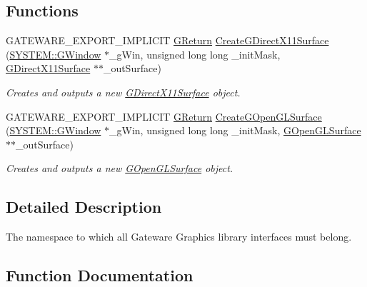 \subsection*{Functions}
\begin{DoxyCompactItemize}
\item 
G\+A\+T\+E\+W\+A\+R\+E\+\_\+\+E\+X\+P\+O\+R\+T\+\_\+\+I\+M\+P\+L\+I\+C\+IT \hyperlink{namespaceGW_a67a839e3df7ea8a5c5686613a7a3de21}{G\+Return} \hyperlink{namespaceGW_1_1GRAPHICS_a3fc9ce5171f60466f1e8784ea13b31ce}{Create\+G\+Direct\+X11\+Surface} (\hyperlink{classGW_1_1SYSTEM_1_1GWindow}{S\+Y\+S\+T\+E\+M\+::\+G\+Window} $\ast$\+\_\+g\+Win, unsigned long long \+\_\+init\+Mask, \hyperlink{classGW_1_1GRAPHICS_1_1GDirectX11Surface}{G\+Direct\+X11\+Surface} $\ast$$\ast$\+\_\+out\+Surface)
\begin{DoxyCompactList}\small\item\em Creates and outputs a new \hyperlink{classGW_1_1GRAPHICS_1_1GDirectX11Surface}{G\+Direct\+X11\+Surface} object. \end{DoxyCompactList}\item 
G\+A\+T\+E\+W\+A\+R\+E\+\_\+\+E\+X\+P\+O\+R\+T\+\_\+\+I\+M\+P\+L\+I\+C\+IT \hyperlink{namespaceGW_a67a839e3df7ea8a5c5686613a7a3de21}{G\+Return} \hyperlink{namespaceGW_1_1GRAPHICS_a67a126b8d3c2fabc556008d2460a3b43}{Create\+G\+Open\+G\+L\+Surface} (\hyperlink{classGW_1_1SYSTEM_1_1GWindow}{S\+Y\+S\+T\+E\+M\+::\+G\+Window} $\ast$\+\_\+g\+Win, unsigned long long \+\_\+init\+Mask, \hyperlink{classGW_1_1GRAPHICS_1_1GOpenGLSurface}{G\+Open\+G\+L\+Surface} $\ast$$\ast$\+\_\+out\+Surface)
\begin{DoxyCompactList}\small\item\em Creates and outputs a new \hyperlink{classGW_1_1GRAPHICS_1_1GOpenGLSurface}{G\+Open\+G\+L\+Surface} object. \end{DoxyCompactList}\end{DoxyCompactItemize}


\subsection{Detailed Description}
The namespace to which all Gateware Graphics library interfaces must belong. 

\subsection{Function Documentation}
\mbox{\label{namespaceGW_1_1GRAPHICS_a3fc9ce5171f60466f1e8784ea13b31ce}} 
